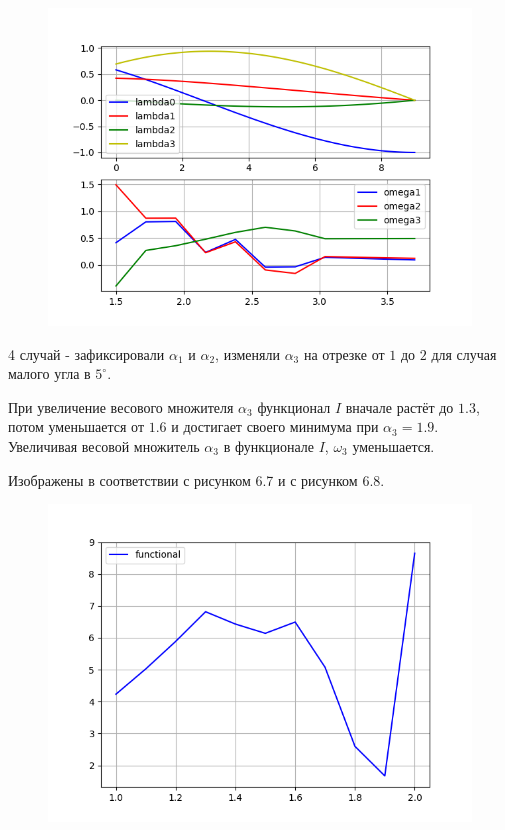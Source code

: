 \documentclass[14pt]{extreport}
\begin{document}
\begin{figure}[H]
\center\includegraphics[scale=0.7]{fig/ivp_and_control_alpha2_1_5-3_7_50.png}
\caption{}
\end{figure}

4 случай - зафиксировали $\alpha_1$ и $\alpha_2$, изменяли $\alpha_3$ на отрезке от $1$ до $2$ для случая малого угла в $5^{\circ}$.

При увеличение весового множителя $\alpha_3$ функционал $I$ вначале растёт до $1.3$, потом уменьшается от $1.6$ и достигает своего минимума при $\alpha_3 = 1.9$. Увеличивая весовой множитель $\alpha_3$ в функционале $I$, $\omega_3$ уменьшается.

Изображены в соответствии с рисунком 6.7 и с рисунком 6.8.

\begin{figure}[H]
\center\includegraphics[scale=0.7]{fig/functional_alpha2_1-2_5.png}
\caption{}
\end{figure}
\end{document}
